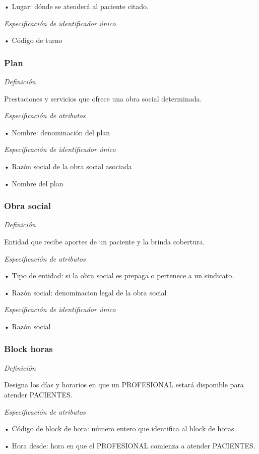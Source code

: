 \documentclass[a4paper,11pt]{article}
\begin{document}
• Lugar: dónde se atenderá al paciente citado.

\textit{Especificación de identificador único}

• Código de turno\label{HToc293405813}

\subsubsection{\textbf{Plan}}

\textit{Definición}

Prestaciones y servicios que ofrece una obra social determinada.

\textit{Especificación de atributos}

• Nombre: denominación del plan

\textit{Especificación de identificador único}

• Razón social de la obra social asociada

• Nombre del plan\label{HToc293405814}

\subsubsection{\textbf{Obra social}}

\textit{Definición}

Entidad que recibe aportes de un paciente y la brinda cobertura.

\textit{Especificación de atributos}

• Tipo de entidad: si la obra social es prepaga o pertenece a un sindicato.

• Razón social: denominacion legal de la obra social

\textit{Especificación de identificador único}

• Razón social\label{HToc293405815}

\subsubsection{\textbf{Block horas}}

\textit{Definición}

Designa los días y horarios en que un PROFESIONAL estará disponible para atender 
PACIENTES.

\textit{Especificación de atributos}

• Código de block de hora: número entero que identifica al block de horas.

• Hora desde: hora en que el PROFESIONAL comienza a atender PACIENTES.
\end{document}
